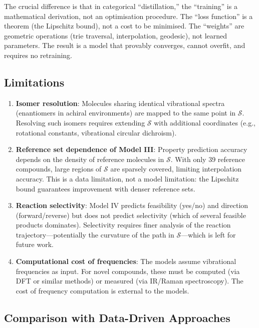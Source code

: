 \documentclass[11pt,twocolumn,a4paper]{article}
\theoremstyle{definition}
\theoremstyle{remark}
\newcommand{\Sspace}{\mathcal{S}}
\begin{document}
The crucial difference is that in categorical ``distillation,'' the ``training'' is a mathematical derivation, not an optimisation procedure. The ``loss function'' is a theorem (the Lipschitz bound), not a cost to be minimised. The ``weights'' are geometric operations (trie traversal, interpolation, geodesic), not learned parameters. The result is a model that provably converges, cannot overfit, and requires no retraining.

\subsection{Limitations}

\begin{enumerate}[nosep]
\item \textbf{Isomer resolution}: Molecules sharing identical vibrational spectra (enantiomers in achiral environments) are mapped to the same point in $\Sspace$. Resolving such isomers requires extending $\Sspace$ with additional coordinates (e.g., rotational constants, vibrational circular dichroism).

\item \textbf{Reference set dependence of Model III}: Property prediction accuracy depends on the density of reference molecules in $\Sspace$. With only 39 reference compounds, large regions of $\Sspace$ are sparsely covered, limiting interpolation accuracy. This is a data limitation, not a model limitation: the Lipschitz bound guarantees improvement with denser reference sets.

\item \textbf{Reaction selectivity}: Model IV predicts feasibility (yes/no) and direction (forward/reverse) but does not predict selectivity (which of several feasible products dominates). Selectivity requires finer analysis of the reaction trajectory---potentially the curvature of the path in $\Sspace$---which is left for future work.

\item \textbf{Computational cost of frequencies}: The models assume vibrational frequencies as input. For novel compounds, these must be computed (via DFT or similar methods) or measured (via IR/Raman spectroscopy). The cost of frequency computation is external to the models.
\end{enumerate}

\subsection{Comparison with Data-Driven Approaches}
\end{document}
